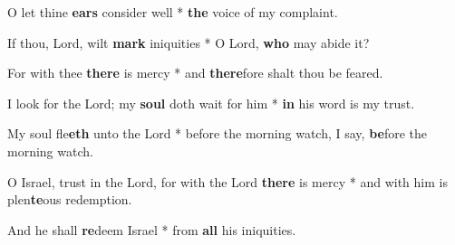 \begin{multicols}{2}
	O let thine \textbf{ears} consider well * \textbf{the} voice of my complaint.
	
	If thou, Lord, wilt \textbf{mark} iniquities * O Lord, \textbf{who} may abide it?
	
	For with thee \textbf{there} is mercy  * and \textbf{there}fore shalt thou be feared.
	
	I look for the Lord; my \textbf{soul} doth wait for him * \textbf{in} his word is my trust.
	
	My soul fle\textbf{eth} unto the Lord * before the morning watch, I say, \textbf{be}fore the morning watch.
	
	O Israel, trust in the Lord, for with the Lord \textbf{there} is mercy * and with him is plen\textbf{te}ous redemption.
	
	And he shall \textbf{re}deem Israel * from \textbf{all} his iniquities.
\end{multicols}